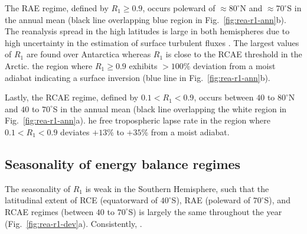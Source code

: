 \documentclass{ametsocV5}
\begin{document}
    The RAE regime, defined by $R_1 \ge 0.9$, occurs poleward of $\approx 80^\circ$N and $\approx 70^\circ$S in the annual mean (black line overlapping blue region in Fig.~\ref{fig:rea-r1-ann}b). The reanalysis spread in the high latitudes is large in both hemispheres due to high uncertainty in the estimation of surface turbulent fluxes \citep{tastula2013,graham2019}. The largest values of $R_1$ are found over Antarctica whereas $R_1$ is close to the RCAE threshold in the Arctic. the region where $R_1\ge 0.9$ exhibits $>100\%$ deviation from a moist adiabat indicating a surface inversion (blue line in Fig.~\ref{fig:rea-r1-ann}b).

    Lastly, the RCAE regime, defined by $0.1 < R_1 < 0.9$, occurs between $40$ to $80^\circ$N and $40$ to $70^\circ$S in the annual mean (black line overlapping the white region in Fig.~\ref{fig:rea-r1-ann}a). he free tropospheric lapse rate in the region where $0.1 < R_1 < 0.9$ deviates $+13$\% to $+35$\% from a moist adiabat.

    \subsection{Seasonality of energy balance regimes} \label{subsec:seasonality}
    The seasonality of $R_1$ is weak in the Southern Hemisphere, such that the latitudinal extent of RCE (equatorward of $40^\circ$S), RAE (poleward of $70^\circ$S), and RCAE regimes (between $40$ to $70^\circ$S) is largely the same throughout the year (Fig.~\ref{fig:rea-r1-dev}a). Consistently, .
\end{document}
